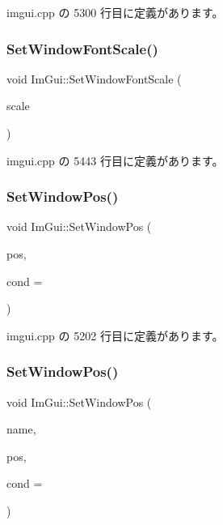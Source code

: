  imgui.\+cpp の 5300 行目に定義があります。

\mbox{\label{namespace_im_gui_a11f2f343dbc9b00ccd9e99ebd59cfe8b}} 
\subsubsection{\texorpdfstring{Set\+Window\+Font\+Scale()}{SetWindowFontScale()}}
{\footnotesize\ttfamily void Im\+Gui\+::\+Set\+Window\+Font\+Scale (\begin{DoxyParamCaption}\item[{float}]{scale }\end{DoxyParamCaption})}



 imgui.\+cpp の 5443 行目に定義があります。

\mbox{\label{namespace_im_gui_aaa81e004de4c0a5cedb836e92e8aa0e5}} 
\subsubsection{\texorpdfstring{Set\+Window\+Pos()}{SetWindowPos()}\hspace{0.1cm}{\footnotesize\ttfamily [1/2]}}
{\footnotesize\ttfamily void Im\+Gui\+::\+Set\+Window\+Pos (\begin{DoxyParamCaption}\item[{const \mbox{\hyperlink{struct_im_vec2}{Im\+Vec2}} \&}]{pos,  }\item[{\mbox{\hyperlink{imgui_8h_aef890d6ac872e12c5804d0b3e4f7f103}{Im\+Gui\+Cond}}}]{cond = {} }\end{DoxyParamCaption})}



 imgui.\+cpp の 5202 行目に定義があります。

\mbox{\label{namespace_im_gui_a32032b56f975bb3145adbe19f38f3b56}} 
\subsubsection{\texorpdfstring{Set\+Window\+Pos()}{SetWindowPos()}\hspace{0.1cm}{\footnotesize\ttfamily [2/2]}}
{\footnotesize\ttfamily void Im\+Gui\+::\+Set\+Window\+Pos (\begin{DoxyParamCaption}\item[{const char $\ast$}]{name,  }\item[{const \mbox{\hyperlink{struct_im_vec2}{Im\+Vec2}} \&}]{pos,  }\item[{\mbox{\hyperlink{imgui_8h_aef890d6ac872e12c5804d0b3e4f7f103}{Im\+Gui\+Cond}}}]{cond = {} }\end{DoxyParamCaption})}



